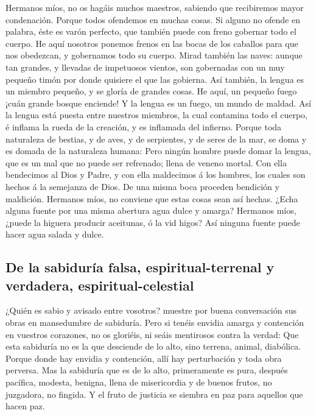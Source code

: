  Hermanos míos, no os hagáis muchos maestros, sabiendo que
recibiremos mayor condenación.  Porque todos ofendemos en
muchas cosas. Si alguno no ofende en palabra, éste es varón perfecto,
que también puede con freno gobernar todo el cuerpo.  He
aquí nosotros ponemos frenos en las bocas de los caballos para que nos
obedezcan, y gobernamos todo su cuerpo.  Mirad también las
naves: aunque tan grandes, y llevadas de impetuosos vientos, son
gobernadas con un muy pequeño timón por donde quisiere el que las
gobierna.  Así también, la lengua es un miembro pequeño, y
se gloría de grandes cosas. He aquí, un pequeño fuego ¡cuán grande
bosque enciende!  Y la lengua es un fuego, un mundo de
maldad. Así la lengua está puesta entre nuestros miembros, la cual
contamina todo el cuerpo, é inflama la rueda de la creación, y es
inflamada del infierno.  Porque toda naturaleza de
bestias, y de aves, y de serpientes, y de seres de la mar, se doma y es
domada de la naturaleza humana:  Pero ningún hombre puede
domar la lengua, que es un mal que no puede ser refrenado; llena de
veneno mortal.  Con ella bendecimos al Dios y Padre, y con
ella maldecimos á los hombres, los cuales son hechos á la semejanza de
Dios.  De una misma boca proceden bendición y maldición.
Hermanos míos, no conviene que estas cosas sean así hechas.
 ¿Echa alguna fuente por una misma abertura agua dulce y
amarga?  Hermanos míos, ¿puede la higuera producir
aceitunas, ó la vid higos? Así ninguna fuente puede hacer agua salada y
dulce.

\hypertarget{de-la-sabiduruxeda-falsa-espiritual-terrenal-y-verdadera-espiritual-celestial}{%
\subsection{De la sabiduría falsa, espiritual-terrenal y verdadera,
espiritual-celestial}\label{de-la-sabiduruxeda-falsa-espiritual-terrenal-y-verdadera-espiritual-celestial}}

 ¿Quién es sabio y avisado entre vosotros? muestre por
buena conversación sus obras en mansedumbre de sabiduría.
 Pero si tenéis envidia amarga y contención en vuestros
corazones, no os gloriéis, ni seáis mentirosos contra la verdad:
 Que esta sabiduría no es la que desciende de lo alto,
sino terrena, animal, diabólica.  Porque donde hay
envidia y contención, allí hay perturbación y toda obra perversa.
 Mas la sabiduría que es de lo alto, primeramente es
pura, después pacífica, modesta, benigna, llena de misericordia y de
buenos frutos, no juzgadora, no fingida.  Y el fruto de
justicia se siembra en paz para aquellos que hacen paz.

